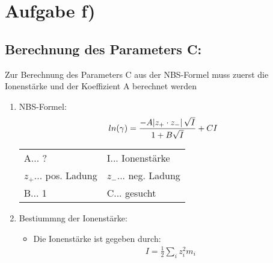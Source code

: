 \section{Aufgabe f)}
\subsection{Berechnung des Parameters C:}

Zur Berechnung des Parameters C aus der NBS-Formel muss zuerst die Ionenstärke und der Koeffizient A berechnet werden
\begin{enumerate}
	\item NBS-Formel:
	      \begin{align*}
		      ln(\gamma) = \frac{-A \abs{z_+ \cdot z_-} \sqrt{I}} {1 + B \sqrt{I}} + CI
	      \end{align*}
	      \begin{table}[H]
		      \centering

		      \begin{tabular}{ll}
			      A... ?               & I... Ionenstärke     \\
			      $z_+$... pos. Ladung & $z_-$... neg. Ladung \\
			      B... 1               & C... gesucht         \\
		      \end{tabular}
	      \end{table}
	\item Bestiummng der Ionenstärke:
	      \begin{itemize}
		      \item Die Ionenstärke ist gegeben durch:
		            \begin{align*}
			            I = \frac{1}{2} \sum\limits_{i} z_i^2m_i
		            \end{align*}
		            \begin{table}[H]
			            \centering


\end{table}
\end{itemize}
\end{enumerate}
